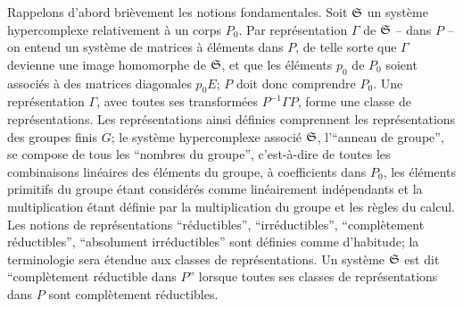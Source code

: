 Rappelons d'abord brièvement les notions fondamentales. Soit $\mathfrak S$ un système hypercomplexe relativement à un corps $P_0$. Par représentation $\Gamma$ de $\mathfrak S$ -- dans $P$ -- on entend un système de matrices à éléments dans $P$, de telle sorte que $\Gamma$ devienne une image homomorphe de $\mathfrak S$, et que les éléments $p_0$ de $P_0$ soient associés à des matrices diagonales $p_0E$; $P$ doit donc comprendre $P_0$. Une représentation $\Gamma$, avec toutes ses transformées $P^{-1}\Gamma P$, forme une classe de représentations. Les représentations ainsi définies comprennent les représentations des groupes finis $G$; le système hypercomplexe associé $\mathfrak S$, l'``anneau de groupe'', se compose de tous les ``nombres du groupe'', c'est-à-dire de toutes les combinaisons linéaires des éléments du groupe, à coefficients dans $P_0$, les éléments primitifs du groupe étant considérés comme linéairement indépendants et la multiplication étant définie par la multiplication du groupe et les règles du calcul. Les notions de représentations ``réductibles'', ``irréductibles'', ``complètement réductibles'', ``absolument irréductibles'' sont définies comme d'habitude; la terminologie sera étendue aux classes de représentations. Un système $\mathfrak S$ est dit ``complètement réductible dans $P$'' lorsque toutes ses classes de représentations dans $P$ sont complètement réductibles.


